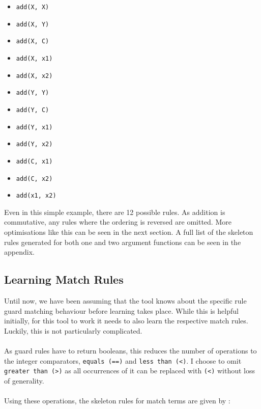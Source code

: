 \begin{multicols}{2}
\begin{itemize}
\item \lstinline{add(X, X)}
\item \lstinline{add(X, Y)}
\item \lstinline{add(X, C)}
\item \lstinline{add(X, x1)}
\item \lstinline{add(X, x2)}
\item \lstinline{add(Y, Y)}
\item \lstinline{add(Y, C)}
\item \lstinline{add(Y, x1)}
\item \lstinline{add(Y, x2)}
\item \lstinline{add(C, x1)}
\item \lstinline{add(C, x2)}
\item \lstinline{add(x1, x2)}
\end{itemize}
\end{multicols}

Even in this simple example, there are 12 possible rules. As addition is commutative, any rules where the ordering is reversed are omitted. More optimisations like this can be seen in the next section.
A full list of the skeleton rules generated for both one and two argument functions can be seen in the appendix.

\subsection{Learning Match Rules}
Until now, we have been assuming that the tool knows about the specific rule guard matching behaviour before learning takes place. While this is helpful initially, for this tool to work it needs to also learn the respective match rules. Luckily, this is not particularly complicated. \\ \\
As guard rules have to return booleans, this reduces the number of operations to the integer comparators, \lstinline{equals (==)} and \lstinline{less than (<)}. I choose to omit \lstinline{greater than (>)} as all occurrences of it can be replaced with \lstinline{(<)} without loss of generality.\\ \\
Using these operations, the skeleton rules for match terms are given by : \\

